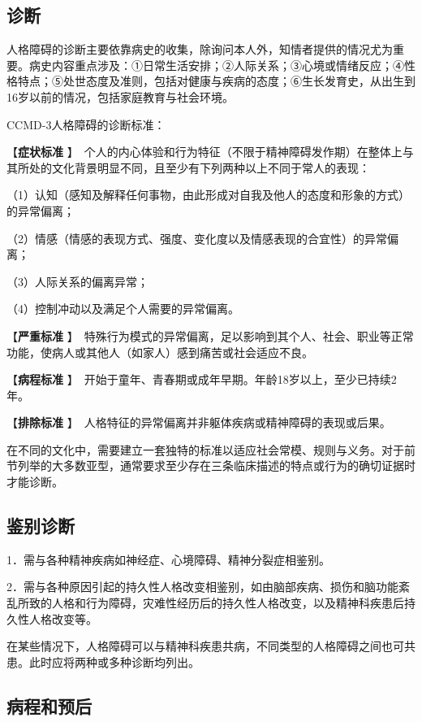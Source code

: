 \subsection{诊断}

人格障碍的诊断主要依靠病史的收集，除询问本人外，知情者提供的情况尤为重要。病史内容重点涉及：①日常生活安排；②人际关系；③心境或情绪反应；④性格特点；⑤处世态度及准则，包括对健康与疾病的态度；⑥生长发育史，从出生到16岁以前的情况，包括家庭教育与社会环境。

CCMD-3人格障碍的诊断标准：

【\textbf{症状标准}
】　个人的内心体验和行为特征（不限于精神障碍发作期）在整体上与其所处的文化背景明显不同，且至少有下列两种以上不同于常人的表现：

（1）认知（感知及解释任何事物，由此形成对自我及他人的态度和形象的方式）的异常偏离；

（2）情感（情感的表现方式、强度、变化度以及情感表现的合宜性）的异常偏离；

（3）人际关系的偏离异常；

（4）控制冲动以及满足个人需要的异常偏离。

【\textbf{严重标准}
】　特殊行为模式的异常偏离，足以影响到其个人、社会、职业等正常功能，使病人或其他人（如家人）感到痛苦或社会适应不良。

【\textbf{病程标准}
】　开始于童年、青春期或成年早期。年龄18岁以上，至少已持续2年。

【\textbf{排除标准}
】　人格特征的异常偏离并非躯体疾病或精神障碍的表现或后果。

在不同的文化中，需要建立一套独特的标准以适应社会常模、规则与义务。对于前节列举的大多数亚型，通常要求至少存在三条临床描述的特点或行为的确切证据时才能诊断。

\subsection{鉴别诊断}

1．需与各种精神疾病如神经症、心境障碍、精神分裂症相鉴别。

2．需与各种原因引起的持久性人格改变相鉴别，如由脑部疾病、损伤和脑功能紊乱所致的人格和行为障碍，灾难性经历后的持久性人格改变，以及精神科疾患后持久性人格改变等。

在某些情况下，人格障碍可以与精神科疾患共病，不同类型的人格障碍之间也可共患。此时应将两种或多种诊断均列出。

\subsection{病程和预后}

